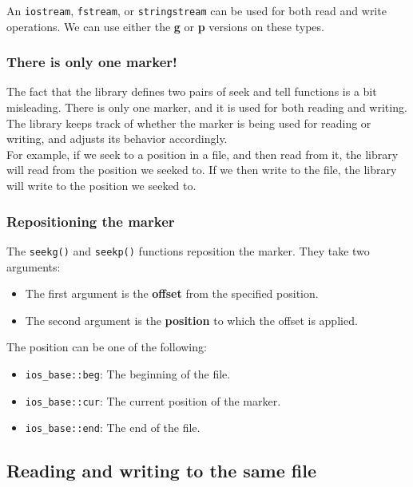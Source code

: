 An \texttt{iostream}, \texttt{fstream}, or \texttt{stringstream} can be used for both read 
and write operations. We can use either the \textbf{g} or \textbf{p} versions on these types.\\

\subsubsection{There is only one marker!}

The fact that the library defines two pairs of seek and tell functions is a bit misleading.
There is only one marker, and it is used for both reading and writing. The library keeps
track of whether the marker is being used for reading or writing, and adjusts its behavior
accordingly.\\

For example, if we seek to a position in a file, and then read from it, the library will
read from the position we seeked to. If we then write to the file, the library will write
to the position we seeked to.

\subsubsection{Repositioning the marker}

The \texttt{seekg()} and \texttt{seekp()} functions reposition the marker. They take two
arguments:

\begin{itemize}
    \item The first argument is the \textbf{offset} from the specified position.
    \item The second argument is the \textbf{position} to which the offset is applied.
\end{itemize}

The position can be one of the following:

\begin{itemize}
    \item \texttt{ios\_base::beg}: The beginning of the file.
    \item \texttt{ios\_base::cur}: The current position of the marker.
    \item \texttt{ios\_base::end}: The end of the file.
\end{itemize}

\subsection{Reading and writing to the same file}

